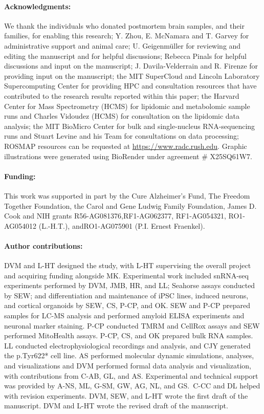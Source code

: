 \paragraph{Acknowledgments:} We thank the individuals who donated postmortem brain samples, and their families, for enabling this research; Y. Zhou, E. McNamara and T. Garvey for administrative support and animal care; U. Geigenmüller for reviewing and editing the manuscript and for helpful discussions; Rebecca Pinals for helpful discussions and input on the manuscript; J. Davila-Velderrain and R. Firenze for providing input on the manuscript; the MIT SuperCloud and Lincoln Laboratory Supercomputing Center for providing HPC and consultation resources that have contributed to the research results reported within this paper; the Harvard Center for Mass Spectrometry (HCMS) for lipidomic and metabolomic sample runs and Charles Vidoudez (HCMS) for consultation on the lipidomic data analysis; the MIT BioMicro Center for bulk and single-nucleus RNA-sequencing runs and Stuart Levine and his Team for consultations on data processing; ROSMAP resources can be requested at \url{https://www.radc.rush.edu}. Graphic illustrations were generated using BioRender under agreement \# X25SQ61W7.

\paragraph{Funding:} This work was supported in part by the Cure Alzheimer’s Fund, The Freedom Together Foundation, the Carol and Gene Ludwig Family Foundation, James D. Cook and NIH grants R56-AG081376,RF1-AG062377, RF1-AG054321, RO1-AG054012 (L.-H.T.), andRO1-AG075901 (P.I. Ernest Fraenkel).

\paragraph{Author contributions:} DVM and L-HT designed the study, with L-HT supervising the overall project and acquiring funding alongside MK. Experimental work included snRNA-seq experiments performed by DVM, JMB, HR, and LL; Seahorse assays conducted by SEW; and differentiation and maintenance of iPSC lines, induced neurons, and cortical organoids by SEW, CS, P-CP, and OK. SEW and P-CP prepared samples for LC-MS analysis and performed amyloid ELISA experiments and neuronal marker staining. P-CP conducted TMRM and CellRox assays and SEW performed MitoHealth assays. P-CP, CS, and OK prepared bulk RNA samples. LL conducted electrophysiological recordings and analysis, and CJY generated the p.Tyr622* cell line. AS performed molecular dynamic simulations, analyses, and visualizations and DVM performed formal data analysis and visualization, with contributions from C-AB, GL, and AS. Experimental and technical support was provided by A-NS, ML, G-SM, GW, AG, NL, and GS. C-CC and DL helped with revision experiments. DVM, SEW, and L-HT wrote the first draft of the manuscript. DVM and L-HT wrote the revised draft of the manuscript.

